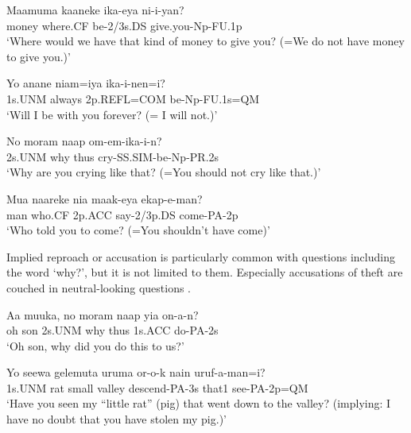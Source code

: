 \ea%
\label{ex:x1205}
\gll Maamuma  kaaneke  ika-eya  ni-i-yan? \\
 money  where.CF  be-2/3s.DS  give.you-Np-FU.1p     \\
\glt `Where would we have that kind of money to give you? (=We do not have money to give you.)'
\z





\ea%
\label{ex:x1206}
\gll Yo  anane  niam=iya  ika-i-nen=i? \\
1s.UNM  always  2p.REFL=COM  be-Np-FU.1s=QM      \\
\glt `Will I be with you forever? (= I will not.)'
\z





\ea%
\label{ex:x1202}
\gll No  moram  naap  om-em-ika-i-n? \\
2s.UNM  why  thus  cry-SS.SIM-be-Np-PR.2s      \\
\glt `Why are you crying like that? (=You should not cry like that.)'
\z





\ea%
\label{ex:x1207}
\gll Mua  naareke  nia  maak-eya  ekap-e-man? \\
man  who.CF  2p.ACC  say-2/3p.DS  come-PA-2p      \\
\glt `Who told you to come? (=You shouldn't have come)'
\z





Implied reproach or accusation is particularly common with  questions including the word  `why?', but it is not limited to them. Especially accusations of theft are couched in neutral-looking questions .

\ea%
\label{ex:x1208}
\gll Aa  muuka,  no  moram  naap  yia  on-a-n? \\
oh  son  2s.UNM  why  thus  1s.ACC  do-PA-2s      \\
\glt `Oh son, why did you do this to us?'
\z





\ea%
\label{ex:x1209}
\gll Yo  seewa  gelemuta  uruma  or-o-k  nain  uruf-a-man=i? \\
 1s.UNM  rat  small  valley  descend-PA-3s  that1  see-PA-2p=QM     \\
\glt `Have you seen my ``little rat'' (pig) that went down to the valley? (implying: I have no doubt that you have stolen my pig.)'
\z




